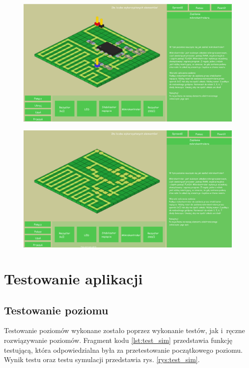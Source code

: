 \documentclass[12pt, a4paper]{article} %
\begin{document}
\begin{figure}[h]
	\centering
	\includegraphics[width=15cm]{images/app_poziom_uc_zle_ulozeni.png}
	\caption{}
	\label{rys:app_poziom_uc_zle_ulozeni}
\end{figure} 

\begin{figure}[h]
	\centering
	\includegraphics[width=15cm]{images/app_poziom_uc_ukryte.png}
	\caption{}
	\label{rys:app_poziom_uc_ukryte}
\end{figure} 

\clearpage
\section{Testowanie aplikacji}
\subsection{Testowanie poziomu}
\aka Testowanie poziomów wykonane zostało poprzez wykonanie testów, jak i~ręczne rozwiązywanie poziomów. Fragment kodu \ref{lst:test_sim} przedstawia funkcję testującą, która odpowiedzialna była za przetestowanie początkowego poziomu. Wynik testu oraz testu symulacji przedstawia rys. \ref{rys:test_sim}.
\end{document}
